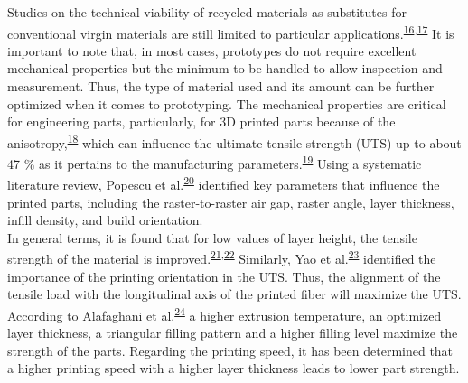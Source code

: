 \documentclass[
  12pt]{article}
\begin{document}
Studies on the technical viability of recycled materials as substitutes for conventional virgin materials are still limited to particular applications.\textsuperscript{\protect\hyperlink{ref-CruzSanchez2020}{16},\protect\hyperlink{ref-Mikula2020}{17}}
It is important to note that, in most cases, prototypes do not require excellent mechanical properties but the minimum to be handled to allow inspection and measurement.
Thus, the type of material used and its amount can be further optimized when it comes to prototyping.
The mechanical properties are critical for engineering parts, particularly, for 3D printed parts because of the anisotropy,\textsuperscript{\protect\hyperlink{ref-Lovo2018}{18}} which can influence the ultimate tensile strength (UTS) up to about 47 \% as it pertains to the manufacturing parameters.\textsuperscript{\protect\hyperlink{ref-Laureto2018}{19}}
Using a systematic literature review, Popescu et al.\textsuperscript{\protect\hyperlink{ref-Popescu2018}{20}} identified key parameters that influence the printed parts, including the raster-to-raster air gap, raster angle, layer thickness, infill density, and build orientation.\\
In general terms, it is found that for low values of layer height, the tensile strength of the material is improved.\textsuperscript{\protect\hyperlink{ref-Tymrak2014a}{21},\protect\hyperlink{ref-Altan2018}{22}}
Similarly, Yao et al.\textsuperscript{\protect\hyperlink{ref-Yao2019}{23}} identified the importance of the printing orientation in the UTS. Thus, the alignment of the tensile load with the longitudinal axis of the printed fiber will maximize the UTS.
According to Alafaghani et al.\textsuperscript{\protect\hyperlink{ref-Alafaghani2018}{24}} a higher extrusion temperature, an optimized layer thickness, a triangular filling pattern and a higher filling level maximize the strength of the parts. Regarding the printing speed, it has been determined that a higher printing speed with a higher layer thickness leads to lower part strength.
\end{document}
